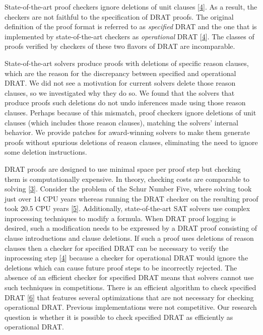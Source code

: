 \documentclass[
]{report}
\begin{document}
State-of-the-art proof checkers ignore deletions of unit clauses
{[}\protect\hyperlink{ref-rebola2018two}{4}{]}. As a result, the
checkers are not faithful to the specification of DRAT proofs. The
original definition of the proof format is referred to as
\emph{specified} DRAT and the one that is implemented by
state-of-the-art checkers as \emph{operational} DRAT
{[}\protect\hyperlink{ref-rebola2018two}{4}{]}. The classes of proofs
verified by checkers of these two flavors of DRAT are incomparable.

State-of-the-art solvers produce proofs with deletions of specific
reason clauses, which are the reason for the discrepancy between
specified and operational DRAT. We did not see a motivation for current
solvers delete those reason clauses, so we investigated why they do so.
We found that the solvers that produce proofs such deletions do not undo
inferences made using those reason clauses. Perhaps because of this
mismatch, proof checkers ignore deletions of unit clauses (which
includes those reason clauses), matching the solvers' internal behavior.
We provide patches for award-winning solvers to make them generate
proofs without spurious deletions of reason clauses, eliminating the
need to ignore some deletion instructions.

DRAT proofs are designed to use minimal space per proof step but
checking them is computationally expensive. In theory, checking costs
are comparable to solving {[}\protect\hyperlink{ref-Heule_2014}{3}{]}.
Consider the problem of the Schur Number Five, where solving took just
over 14 CPU years whereas running the DRAT checker on the resulting
proof took 20.5 CPU years {[}\protect\hyperlink{ref-schur-5}{5}{]}.
Additionally, state-of-the-art SAT solvers use complex inprocessing
techniques to modify a formula. When DRAT proof logging is desired, such
a modification needs to be expressed by a DRAT proof consisting of
clause introductions and clause deletions. If such a proof uses
deletions of reason clauses then a checker for specified DRAT can be
necessary to verify the inprocessing step
{[}\protect\hyperlink{ref-rebola2018two}{4}{]} because a checker for
operational DRAT would ignore the deletions which can cause future proof
steps to be incorrectly rejected. The absence of an efficient checker
for specified DRAT means that solvers cannot use such techniques in
competitions. There is an efficient algorithm to check specified DRAT
{[}\protect\hyperlink{ref-RebolaCruz2018}{6}{]} that features several
optimizations that are not necessary for checking operational DRAT.
Previous implementations were not competitive. Our research question is
whether it is possible to check specified DRAT as efficiently as
operational DRAT.
\end{document}
